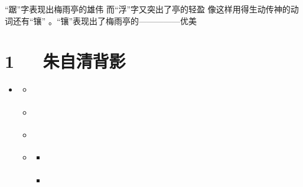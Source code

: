 \documentclass[letterpaper,12pt,english]{sphinxmanual}
\begin{document}
“踞”字表现出梅雨亭的雄伟 而“浮”字又突出了亭的轻盈
像这样用得生动传神的动词还有“镶” 。“镶”表现出了梅雨亭的—————优美


\chapter{1   朱自清\sphinxhyphen{}背影}
\label{\detokenize{p01_u6563_u6587/_u6731_u81ea_u6e05-_u80cc_u5f71:id1}}\label{\detokenize{p01_u6563_u6587/_u6731_u81ea_u6e05-_u80cc_u5f71::doc}}
\begin{sphinxShadowBox}
\begin{itemize}
\item {} 
\label{\detokenize{p01_u6563_u6587/_u6731_u81ea_u6e05-_u80cc_u5f71:id14}}{\hyperref[\detokenize{p01_u6563_u6587/_u6731_u81ea_u6e05-_u80cc_u5f71:id1}]{}}
\begin{itemize}
\item {} 
\label{\detokenize{p01_u6563_u6587/_u6731_u81ea_u6e05-_u80cc_u5f71:id15}}{\hyperref[\detokenize{p01_u6563_u6587/_u6731_u81ea_u6e05-_u80cc_u5f71:id3}]{}}

\item {} 
\label{\detokenize{p01_u6563_u6587/_u6731_u81ea_u6e05-_u80cc_u5f71:id16}}{\hyperref[\detokenize{p01_u6563_u6587/_u6731_u81ea_u6e05-_u80cc_u5f71:id4}]{}}

\item {} 
\label{\detokenize{p01_u6563_u6587/_u6731_u81ea_u6e05-_u80cc_u5f71:id17}}{\hyperref[\detokenize{p01_u6563_u6587/_u6731_u81ea_u6e05-_u80cc_u5f71:id5}]{}}

\item {} 
\label{\detokenize{p01_u6563_u6587/_u6731_u81ea_u6e05-_u80cc_u5f71:id18}}{\hyperref[\detokenize{p01_u6563_u6587/_u6731_u81ea_u6e05-_u80cc_u5f71:id6}]{}}
\begin{itemize}
\item {} 
\label{\detokenize{p01_u6563_u6587/_u6731_u81ea_u6e05-_u80cc_u5f71:id19}}{\hyperref[\detokenize{p01_u6563_u6587/_u6731_u81ea_u6e05-_u80cc_u5f71:id7}]{}}

\item {} 
\label{\detokenize{p01_u6563_u6587/_u6731_u81ea_u6e05-_u80cc_u5f71:id20}}{\hyperref[\detokenize{p01_u6563_u6587/_u6731_u81ea_u6e05-_u80cc_u5f71:id8}]{}}


\end{itemize}
\end{itemize}
\end{itemize}
\end{sphinxShadowBox}
\end{document}
